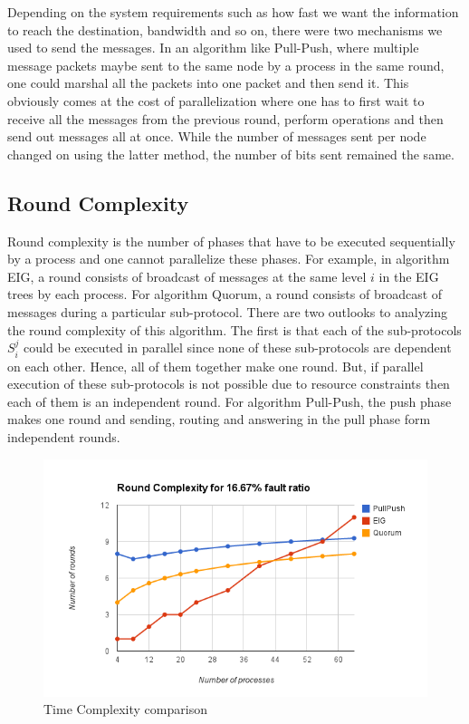 Depending on the system requirements such as how fast we want the information to reach the destination, bandwidth and so on, there were two mechanisms we used to send the messages. In an algorithm like Pull-Push, where multiple message packets maybe sent to the same node by a process in the same round, one could marshal all the packets into one packet and then send it. This obviously comes at the cost of parallelization where one has to first wait to receive all the messages from the previous round, perform operations and then send out messages all at once. While the number of messages sent per node changed on using the latter method, the number of bits sent remained the same.


\subsection{Round Complexity}
Round complexity is the number of phases that have to be executed sequentially by a process and one cannot parallelize these phases. For example, in algorithm EIG, a round consists of broadcast of messages at the same level $i$ in the EIG trees by each process. For algorithm Quorum, a round consists of broadcast of messages during a particular sub-protocol. There are two outlooks to analyzing the round complexity of this algorithm. The first is that each of the sub-protocols $S_i^j$ could be executed in parallel since none of these sub-protocols are dependent on each other. Hence, all of them together make one round. But, if parallel execution of these sub-protocols is not possible due to resource constraints then each of them is an independent round. For algorithm Pull-Push, the push phase makes one round and sending, routing and answering in the pull phase form independent rounds.

\begin{figure}[ht]
 \centering
\includegraphics[scale=0.4]{Round16}
\caption{Time Complexity comparison}
 \label{fig:round16}
\end{figure}

